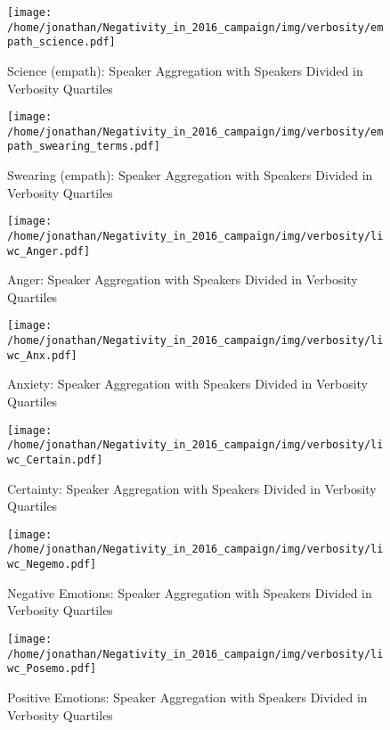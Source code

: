 \begin{figure}[h]\centering
	\texttt{[image: /home/jonathan/Negativity\_in\_2016\_campaign/img/verbosity/empath\_science.pdf]}
	\caption{Science (empath): Speaker Aggregation with Speakers Divided in Verbosity Quartiles}
	\label{fig: verbosity_Science (empath)}
\end{figure}

\begin{figure}[h]\centering
	\texttt{[image: /home/jonathan/Negativity\_in\_2016\_campaign/img/verbosity/empath\_swearing\_terms.pdf]}
	\caption{Swearing (empath): Speaker Aggregation with Speakers Divided in Verbosity Quartiles}
	\label{fig: verbosity_Swearing (empath)}
\end{figure}

\begin{figure}[h]\centering
	\texttt{[image: /home/jonathan/Negativity\_in\_2016\_campaign/img/verbosity/liwc\_Anger.pdf]}
	\caption{Anger: Speaker Aggregation with Speakers Divided in Verbosity Quartiles}
	\label{fig: verbosity_Anger}
\end{figure}

\begin{figure}[h]\centering
	\texttt{[image: /home/jonathan/Negativity\_in\_2016\_campaign/img/verbosity/liwc\_Anx.pdf]}
	\caption{Anxiety: Speaker Aggregation with Speakers Divided in Verbosity Quartiles}
	\label{fig: verbosity_Anxiety}
\end{figure}

\begin{figure}[h]\centering
	\texttt{[image: /home/jonathan/Negativity\_in\_2016\_campaign/img/verbosity/liwc\_Certain.pdf]}
	\caption{Certainty: Speaker Aggregation with Speakers Divided in Verbosity Quartiles}
	\label{fig: verbosity_Certainty}
\end{figure}

\begin{figure}[h]\centering
	\texttt{[image: /home/jonathan/Negativity\_in\_2016\_campaign/img/verbosity/liwc\_Negemo.pdf]}
	\caption{Negative Emotions: Speaker Aggregation with Speakers Divided in Verbosity Quartiles}
	\label{fig: verbosity_Negative Emotions}
\end{figure}

\begin{figure}[h]\centering
	\texttt{[image: /home/jonathan/Negativity\_in\_2016\_campaign/img/verbosity/liwc\_Posemo.pdf]}
	\caption{Positive Emotions: Speaker Aggregation with Speakers Divided in Verbosity Quartiles}
	\label{fig: verbosity_Positive Emotions}
\end{figure}

